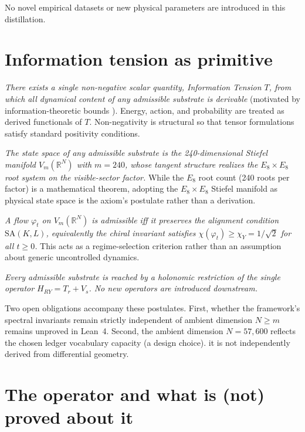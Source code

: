 \documentclass{alienfolio}
\begin{document}
No novel empirical datasets or new physical parameters are introduced in
this distillation.

\section{Information tension as primitive}

 \textit{There exists a
single non-negative scalar quantity, Information Tension $T$, from which
all dynamical content of any admissible substrate is derivable}
(motivated by information-theoretic bounds \cite{shannon48}). Energy,
action, and probability are treated as derived functionals of $T$.
Non-negativity is structural so that tensor formulations satisfy standard
positivity conditions.

 \textit{The state space
of any admissible substrate is the 240-dimensional Stiefel manifold
$V_m(\mathbb{R}^N)$ with $m = 240$, whose tangent structure realizes the
$E_8 \times E_8$ root system on the visible-sector factor.} While the
$E_8$ root count (240 roots per factor) is a mathematical theorem, adopting
the $E_8 \times E_8$ Stiefel manifold as physical state space is the
axiom's postulate rather than a derivation.

 \textit{A flow $\varphi_t$ on
$V_m(\mathbb{R}^N)$ is admissible iff it preserves the alignment
condition $\mathrm{SA}(K,L)$, equivalently the chiral invariant satisfies
$\chi(\varphi_t) \ge \chi_Y = 1/\sqrt{2}$ for all $t \ge 0$.} This acts
as a regime-selection criterion rather than an assumption about generic
uncontrolled dynamics.

 \textit{Every admissible substrate is
reached by a holonomic restriction of the single operator
$H_{RY} = T_r + V_s$. No new operators are introduced downstream.}

Two open obligations accompany these postulates. First, whether the
framework's spectral invariants remain strictly independent of ambient
dimension $N \ge m$ remains unproved in Lean~4. Second, the ambient
dimension $N = 57{,}600$ reflects the chosen ledger vocabulary capacity
(a design choice).  it is not independently derived from differential geometry.

\section{The operator and what is (not) proved about it}
\end{document}
